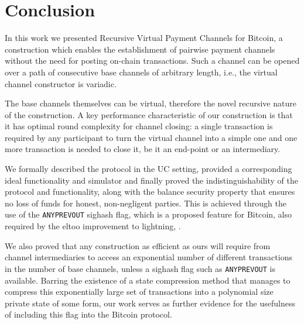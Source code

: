 \section{Conclusion}

  In this work we presented Recursive Virtual Payment Channels for Bitcoin,
  a construction which enables the establishment of pairwise payment channels without the need for
  posting on-chain transactions. Such a channel can be opened over a path of consecutive base
  channels of arbitrary length, i.e., the virtual channel constructor is variadic. 

  The base channels themselves
  can be virtual, therefore the novel recursive nature of the construction. 
  A key performance characteristic of our construction is that it has optimal
  round complexity for channel closing: a single transaction is required
  by any participant to turn the virtual channel into a simple one and one more
  transaction is needed to close it, be it an end-point or an intermediary. 
  
  We formally described the protocol in the UC setting, provided a corresponding
  ideal functionality and simulator and finally proved the indistinguishability
  of the protocol and functionality, along with the balance security property
  that ensures no loss of funds for honest, non-negligent parties. This is
  achieved through the use of the \texttt{ANYPREVOUT} sighash flag, which is a
  proposed feature for Bitcoin, also required by the eltoo improvement to lightning, 
  \cite{eltoo}. 

  We also proved that any construction as efficient 
  as ours
  will require from channel intermediaries to access 
  an exponential number of different transactions in the number of base channels,
  unless a sighash flag such as \texttt{ANYPREVOUT} is available. Barring the existence
  of a state compression method that manages to compress this exponentially large
  set of transactions into a polynomial size private state of some form, our
 work serves as further evidence for the usefulness of
  including this flag into the Bitcoin protocol. 

\newpage
